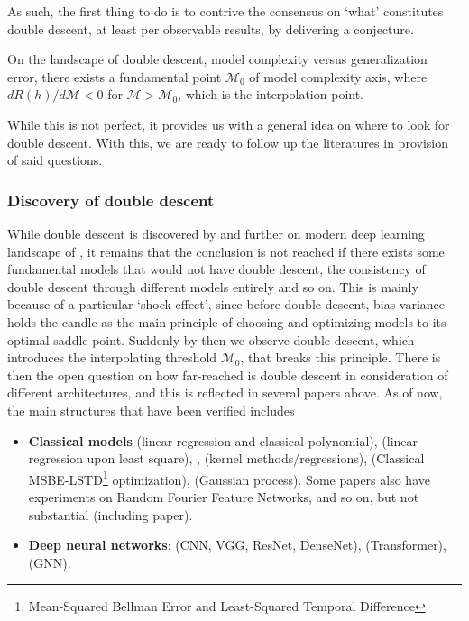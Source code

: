 \documentclass[10pt]{article} %
\begin{document}
As such, the first thing to do is to contrive the consensus on `what' constitutes double descent, at least per observable results, by delivering a conjecture. 

\begin{conjecture}
    On the landscape of double descent, model complexity versus generalization error, there exists a fundamental point $\mathcal{M}_{0}$ of model complexity axis, where $dR(h)/d\mathcal{M}< 0$ for $\mathcal{M}> \mathcal{M}_{0}$, which is the interpolation point. 
\end{conjecture}

While this is not perfect, it provides us with a general idea on where to look for double descent. With this, we are ready to follow up the literatures in provision of said questions. 

\subsubsection{Discovery of double descent}
While double descent is discovered by \cite{belkin_reconciling_2019} and further on modern deep learning landscape of \cite{nakkiran_deep_2019}, it remains that the conclusion is not reached if there exists some fundamental models that would not have double descent, the consistency of double descent through different models entirely and so on. This is mainly because of a particular `shock effect', since before double descent, bias-variance holds the candle as the main principle of choosing and optimizing models to its optimal saddle point. Suddenly by then we observe double descent, which introduces the interpolating threshold $\mathcal{M}_{0}$, that breaks this principle. There is then the open question on how far-reached is double descent in consideration of different architectures, and this is reflected in several papers above. As of now, the main structures that have been verified includes
\begin{itemize}[topsep=1pt, itemsep=1pt]
    \item \textbf{Classical models} \cite{Yang_2024,nakkiran2019moredata,schaeffer_double_2023,lafon_understanding_2024} (linear regression and classical polynomial), \cite{NEURIPS2024_2d43f7a6} (linear regression upon least square), \cite{liu2021kernelregressionhighdimensions}, \cite{zhang2024manipulatingsparsedoubledescent,allerbo2025changingkerneltrainingleads} (kernel methods/regressions), \cite{brellmann2024on} (Classical MSBE-LSTD\footnote{Mean-Squared Bellman Error and Least-Squared Temporal Difference} optimization), \cite{harzli2023doubledescentcurvesneuralnetworks} (Gaussian process). Some papers also have experiments on Random Fourier Feature Networks, and so on, but not substantial (including \cite{belkin_reconciling_2019} paper). 
    \item \textbf{Deep neural networks}: \cite{luo2023doubledescentdiscrepancytask,Yang_2024,pezeshki2021multiscalefeaturelearningdynamics} (CNN, VGG, ResNet, DenseNet), \cite{nakkiran_deep_2019} (Transformer), \cite{shi2024homophilymodulatesdoubledescent} (GNN). 
\end{itemize}
\end{document}
